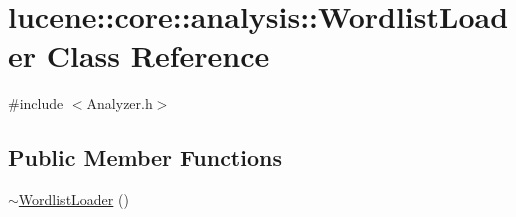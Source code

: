 \hypertarget{classlucene_1_1core_1_1analysis_1_1WordlistLoader}{}\section{lucene\+:\+:core\+:\+:analysis\+:\+:Wordlist\+Loader Class Reference}
\label{classlucene_1_1core_1_1analysis_1_1WordlistLoader}


{\ttfamily \#include $<$Analyzer.\+h$>$}

\subsection*{Public Member Functions}
\begin{DoxyCompactItemize}
\item 
\mbox{\hyperlink{classlucene_1_1core_1_1analysis_1_1WordlistLoader_ad1c978aae7cd9e657bbe36926e12952e}{$\sim$\+Wordlist\+Loader}} ()
\end{DoxyCompactItemize}
